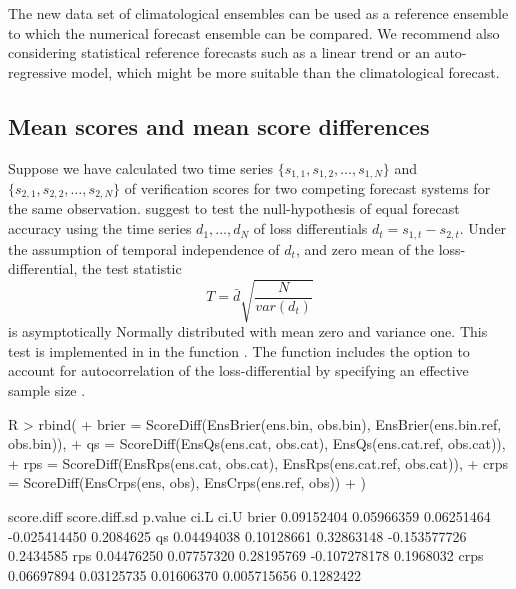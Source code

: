\documentclass[article]{jss}
\begin{document}
The new data set of climatological ensembles can be used as a reference ensemble to which the numerical forecast ensemble can be compared.
We recommend also considering statistical reference forecasts such as a linear trend or an auto-regressive model, which might be more suitable than the climatological forecast.



\subsection{Mean scores and mean score differences}

Suppose we have calculated two time series $\{s_{1,1}, s_{1,2}, \dots, s_{1,N}\}$ and $\{s_{2,1}, s_{2,2}, \dots, s_{2,N}\}$ of verification scores for two competing forecast systems for the same observation.
\citet{diebold1995comparing} suggest to test the null-hypothesis of equal forecast accuracy using the time series $d_1, \dots, d_N$ of loss differentials $d_t = s_{1,t} - s_{2,t}$. 
Under the assumption of temporal independence of $d_t$, and zero mean of the loss-differential, the test statistic 
%
\begin{equation}
T = \bar{d}\sqrt{\frac{N}{var(d_t)}}
\end{equation}
%
is asymptotically Normally distributed with mean zero and variance one.
This test is implemented in  in the function .
The function includes the option to account for autocorrelation of the loss-differential by specifying an effective sample size .

\begin{Schunk}
\begin{Sinput}
R > rbind(
+   brier = ScoreDiff(EnsBrier(ens.bin, obs.bin), EnsBrier(ens.bin.ref, obs.bin)),
+   qs    = ScoreDiff(EnsQs(ens.cat, obs.cat),    EnsQs(ens.cat.ref, obs.cat)),
+   rps   = ScoreDiff(EnsRps(ens.cat, obs.cat),   EnsRps(ens.cat.ref, obs.cat)),
+   crps  = ScoreDiff(EnsCrps(ens, obs),          EnsCrps(ens.ref, obs))
+ )
\end{Sinput}
\begin{Soutput}
      score.diff score.diff.sd    p.value         ci.L      ci.U
brier 0.09152404    0.05966359 0.06251464 -0.025414450 0.2084625
qs    0.04494038    0.10128661 0.32863148 -0.153577726 0.2434585
rps   0.04476250    0.07757320 0.28195769 -0.107278178 0.1968032
crps  0.06697894    0.03125735 0.01606370  0.005715656 0.1282422
\end{Soutput}
\end{Schunk}
\end{document}
